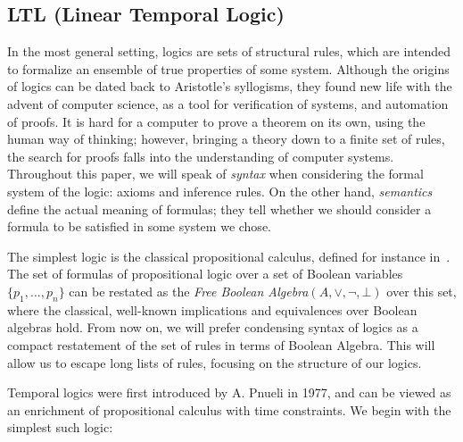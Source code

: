 \documentclass[11pt]{article}
\newcommand{\orr}{{\vee}}
\begin{document}
\subsection{LTL (Linear Temporal Logic)}
In the most general setting, logics are sets of structural rules, which are intended to
formalize an ensemble of true properties of some system. Although the origins of logics can 
be dated back to Aristotle's syllogisms, they found new life with the advent of computer 
science, as a tool for verification of systems, and automation of proofs. It is hard
for a computer to prove a theorem on its own, using the human way of thinking; however,
bringing a theory down to a finite set of rules, the search for proofs falls into the 
understanding of computer systems. Throughout this paper, we will speak of \emph{syntax} when
considering the formal system of the logic: axioms and inference rules. On the other hand,
\emph{semantics} define the actual meaning of formulas; they tell whether we should consider a
formula to be satisfied in some system we chose.

The simplest logic is the classical propositional calculus, defined for instance in~\cite{PropLog}. 
The set of formulas of propositional logic over a set of Boolean variables 
$\{p_1,\ldots,p_n\}$ can be restated as the \emph{Free Boolean Algebra}\cite{GehvG22}$(A,\orr,\neg,\bot)$
over this set,
where the classical, well-known implications and equivalences over Boolean algebras hold. From now
on, we will prefer condensing syntax of logics as a compact restatement of the set of rules
in terms of Boolean Algebra. This will allow us to escape long lists of rules, focusing on the
structure of our logics.

Temporal logics were first introduced by A. Pnueli in 1977, and can be
viewed as an enrichment of propositional calculus with time constraints. We begin with the simplest
such logic:
\end{document}
